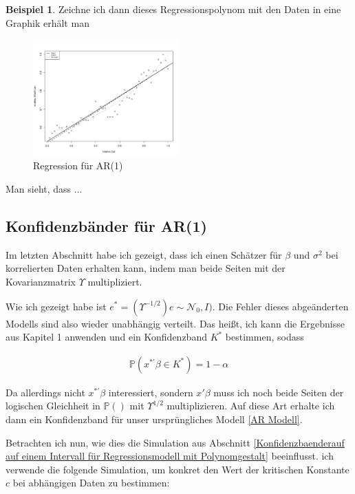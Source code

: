 \documentclass[12pt,a4paper]{article}
\theoremstyle{definition}
\newtheorem{Beispiel}[Definition]{Beispiel}
\theoremstyle{definition}
\theoremstyle{definition}
\begin{document}
\begin{Beispiel}
Zeichne ich dann dieses Regressionspolynom mit den Daten in eine Graphik erhält man

\begin{figure}[H] 
  \centering
     \includegraphics[width=0.5\textwidth]{Bsp-Reg-AR}
  \caption{Regression für AR(1)}
  \label{BSP-Reg-AR}
\end{figure}

Man sieht, dass ...

\end{Beispiel}




\subsection{Konfidenzbänder für AR(1)}
\label{Konfidenzbaender für AR(1)}
Im letzten Abschnitt habe ich gezeigt, dass ich einen Schätzer für $\beta$ und $\sigma^2$ bei korrelierten Daten erhalten kann, indem man beide Seiten mit der Kovarianzmatrix $\Upsilon$ multipliziert. 

Wie ich gezeigt habe ist $e^{*} = (\Upsilon^{-1/2})e \sim \mathscr{N}_0,I)$. Die Fehler dieses abgeänderten Modells sind also wieder unabhängig verteilt. Das heißt, ich kann die Ergebnisse aus Kapitel 1 anwenden und ein Konfidenzband $K^{*}$ bestimmen, sodass

\begin{align*}
\mathbb{P}(x^{*'} \beta \in K^{*}) = 1 - \alpha
\end{align*}

Da allerdings nicht $x^{*'} \beta$ interessiert, sondern $x' \beta$ muss ich noch beide Seiten der logischen Gleichheit in $\mathbb{P}()$ mit $\Upsilon^{1/2}$ multiplizieren. Auf diese Art erhalte ich dann ein Konfidenzband für unser ursprüngliches Modell \eqref{AR Modell}.

Betrachten ich nun, wie dies die Simulation aus Abschnitt \ref{Konfidenzbaenderauf auf einem Intervall für Regressionsmodell mit Polynomgestalt} beeinflusst. ich verwende die folgende Simulation, um konkret den Wert der kritischen Konstante $c$ bei abhängigen Daten zu bestimmen:
\end{document}
